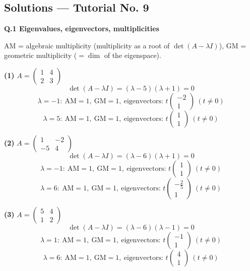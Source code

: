 \subsection*{Solutions --- Tutorial No. 9}
\medskip\noindent\textbf{Q.1  Eigenvalues, eigenvectors, multiplicities}\par\smallskip
AM = algebraic multiplicity (multiplicity as a root of $\det(A-\lambda I)$), GM = geometric multiplicity ($=\dim$ of the eigenspace).

\noindent\textbf{(1)} $A=\begin{pmatrix}1 & 4 \\ 2 & 3\end{pmatrix}$
\[ \det(A-\lambda I)=\left(\lambda - 5\right) \left(\lambda + 1\right)=0 \]
\[ \lambda=-1:\ \text{AM}=1,\ \text{GM}=1,\ \text{eigenvectors: }t\begin{pmatrix}-2 \\ 1\end{pmatrix}\ (t\neq0) \]
\[ \lambda=5:\ \text{AM}=1,\ \text{GM}=1,\ \text{eigenvectors: }t\begin{pmatrix}1 \\ 1\end{pmatrix}\ (t\neq0) \]

\noindent\textbf{(2)} $A=\begin{pmatrix}1 & -2 \\ -5 & 4\end{pmatrix}$
\[ \det(A-\lambda I)=\left(\lambda - 6\right) \left(\lambda + 1\right)=0 \]
\[ \lambda=-1:\ \text{AM}=1,\ \text{GM}=1,\ \text{eigenvectors: }t\begin{pmatrix}1 \\ 1\end{pmatrix}\ (t\neq0) \]
\[ \lambda=6:\ \text{AM}=1,\ \text{GM}=1,\ \text{eigenvectors: }t\begin{pmatrix}- \frac{2}{5} \\ 1\end{pmatrix}\ (t\neq0) \]

\noindent\textbf{(3)} $A=\begin{pmatrix}5 & 4 \\ 1 & 2\end{pmatrix}$
\[ \det(A-\lambda I)=\left(\lambda - 6\right) \left(\lambda - 1\right)=0 \]
\[ \lambda=1:\ \text{AM}=1,\ \text{GM}=1,\ \text{eigenvectors: }t\begin{pmatrix}-1 \\ 1\end{pmatrix}\ (t\neq0) \]
\[ \lambda=6:\ \text{AM}=1,\ \text{GM}=1,\ \text{eigenvectors: }t\begin{pmatrix}4 \\ 1\end{pmatrix}\ (t\neq0) \]

